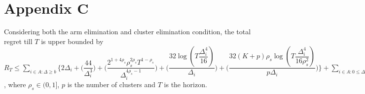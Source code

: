 \section{Appendix C}

\begin{theorem}
Considering both the arm elimination and cluster elimination condition, the total regret till $T$ is upper bounded by $R_{T}\leq \sum_{i\in A:\Delta\geq b} \bigg\lbrace 2\Delta_{i}+ \bigg(\dfrac{44}{\Delta_{i}^{3}}\bigg) + \bigg(\dfrac{2^{1+4\rho_{s}}\rho_{s}^{2\rho_{s}}T^{1-\rho_{s}}}{\Delta_{i}^{4\rho_{s}-1}}\bigg) + \bigg(\dfrac{32\log{(T\dfrac{\Delta_{i}^{4}}{16})}}{\Delta_{i}}\bigg) + \bigg(\dfrac{32(K+p)\rho_{s}\log{(T\dfrac{\Delta_{i}^{4}}{16\rho_{s}^{2}})}}{p\Delta_{i}}\bigg)\bigg\rbrace + \sum_{i\in A:0\leq\Delta_{i}\leq b}\bigg\lbrace \bigg(\dfrac{12}{b^{3}} \bigg) + \bigg(\dfrac{T^{1-\rho_{s}}\rho_{s}^{2\rho_{s}}2^{2\rho_{s}+\frac{3}{2}}}{\Delta_{i}^{4\rho_{s}-1}} \bigg)+\bigg(\dfrac{T^{1-\rho_{s}}\rho_{s}^{2\rho_{s}}2^{2\rho_{s}+\frac{3}{2}}}{b^{4\rho_{s} -1}} \bigg) \bigg\rbrace + max_{i:\Delta\leq b}\Delta_{i}T $, where $\rho_{s}\in (0,1]$, $p$ is the number of clusters and $T$ is the horizon.
\end{theorem}

